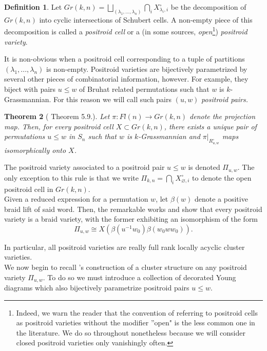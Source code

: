 \documentclass[11pt]{amsart}
\newtheorem{thm}{Theorem}[section]
\theoremstyle{definition}
\newtheorem{defn}[thm]{Definition}
\theoremstyle{remark}
\renewcommand{\emptyset}{\varnothing}
\numberwithin{equation}{section}
\begin{document}
\begin{defn}
    Let $Gr(k,n) = \bigsqcup_{(\lambda_1, ..., \lambda_n)} \bigcap_i X_{\lambda_i, i}^\circ$ be the decomposition of $Gr(k,n)$ into cyclic intersections of Schubert cells. A non-empty piece of this decomposition is called a \textit{positroid cell} or a (in some sources, \textit{open}\footnote{Indeed, we warn the reader that the convention of referring to positroid cells as positroid varieties without the modifier ''open" is the less common one in the literature. We do so throughout nonetheless because we will consider closed positroid varieties only vanishingly often.}) \textit{positroid variety}.
\end{defn}

It is non-obvious when a positroid cell corresponding to a tuple of partitions $(\lambda_1, ..., \lambda_n)$ is non-empty. Positroid varieties are bijectively parametrized by several other pieces of combinatorial information, however. For example, they biject with pairs $u \leq w$ of Bruhat related permutations such that $w$ is $k$-Grassmannian. For this reason we will call such pairs $(u, w)$ \textit{positroid pairs.}

\begin{thm}[\cite{KLS} Theorem 5.9.]\label{projected}
    Let $\pi: Fl(n) \rightarrow Gr(k,n)$ denote the projection map. Then, for every positroid cell $X \subset Gr(k,n)$, there exists a unique pair of permutations $u \leq w$ in $S_n$ such that $w$ is $k$-Grassmannian and $\pi|_{R_{u,w}^\circ}$ maps isomorphically onto $X$.
\end{thm}

The positroid variety associated to a positroid pair $u \leq w$ is denoted $\Pi_{u,w}$. The only exception to this rule is that we write $\Pi_{k,n} = \bigcap_i X_{\emptyset, i}^\circ$ to denote the open positroid cell in $Gr(k,n)$.\\

Given a reduced expression for a permutation $w$, let $\beta(w)$ denote a positive braid lift of said word. Then, the remarkable works \cite{CGGLSS} and \cite{GLSBSI} show that every positroid variety is a braid variety, with the former exhibiting an isomorphism of the form $$\Pi_{u,w} \cong X(\beta(u^{-1}w_0)\beta(w_0ww_0)).$$

In particular, all positroid varieties are really full rank locally acyclic cluster varieties.\\

We now begin to recall \cite{GaLa}'s construction of a cluster structure on any positroid variety $\Pi_{u,w}$. To do so we must introduce a collection of decorated Young diagrams which also bijectively parametrize positroid pairs $u \leq w$.
\end{document}
